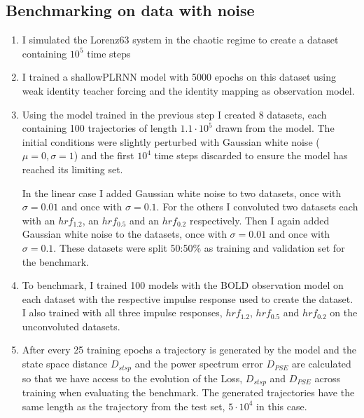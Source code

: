 \subsection{Benchmarking on data with noise}\label{sec:noisy_lorenz}
\begin{enumerate}
    \item I simulated the Lorenz63 system in the chaotic regime to create a dataset containing $10^5$ time steps

    \item I trained a shallowPLRNN model with 5000 epochs on this dataset using weak identity teacher forcing and the identity mapping as observation model.
    
    \item Using the model trained in the previous step I created 8 datasets, each containing 100 trajectories of length $1.1 \cdot 10^5$ drawn from the model. The initial conditions
          were slightly perturbed with Gaussian white noise ($\mu=0, \sigma=1$) and the first $10^4$ time steps discarded to ensure the model has reached its limiting set.

          In the linear case I added Gaussian white noise to two datasets, once with $\sigma=0.01$ and once with $\sigma=0.1$. For the others I convoluted two datasets 
          each with an $hrf_{1.2}$, an $hrf_{0.5}$ and an $hrf_{0.2}$ respectively. Then I again added Gaussian white noise to the datasets, 
          once with $\sigma=0.01$ and once with $\sigma=0.1$. These datasets were split 50:50\% as training and validation set for the benchmark.

    \item To benchmark, I trained 100 models with the BOLD observation model on each dataset with the respective impulse response used to create the dataset. I also trained 
          with all three impulse responses, $hrf_{1.2}$,  $hrf_{0.5}$ and $hrf_{0.2}$ on the unconvoluted datasets.

    \item After every 25 training epochs a trajectory is generated by the model and the state space distance $D_{stsp}$ and the power spectrum error $D_{PSE}$ are calculated
          so that we have access to the evolution of the Loss, $D_{stsp}$ and $D_{PSE}$ across training when evaluating the benchmark. The generated trajectories have the same
          length as the trajectory from the test set, $5\cdot 10^4$ in this case.
\end{enumerate}

